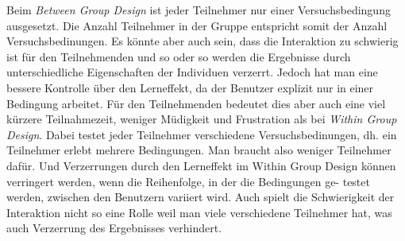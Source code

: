 Beim \textit{Between Group Design} ist jeder 
Teilnehmer nur einer Versuchsbedingung ausgesetzt.
Die Anzahl Teilnehmer in der Gruppe entspricht somit der Anzahl Versuchsbedinungen.
Es könnte aber auch sein, dass die Interaktion zu schwierig ist für den Teilnehmenden und 
so oder so werden die Ergebnisse durch unterschiedliche Eigenschaften der Individuen verzerrt.
Jedoch hat man eine bessere Kontrolle über den Lerneffekt, da der Benutzer explizit nur in einer Bedingung arbeitet. 
Für den Teilnehmenden bedeutet dies aber auch eine viel kürzere Teilnahmezeit, weniger Müdigkeit
und Frustration als bei \textit{Within Group Design}. Dabei testet jeder Teilnehmer verschiedene
Versuchsbedinungen, dh. ein Teilnehmer erlebt mehrere Bedingungen. Man braucht also weniger Teilnehmer 
dafür. Und Verzerrungen durch den Lerneffekt im Within Group Design können
verringert werden, wenn die Reihenfolge, in der die Bedingungen ge-
testet werden, zwischen den Benutzern variiert wird. Auch spielt die Schwierigkeit der 
Interaktion nicht so eine Rolle weil man viele verschiedene Teilnehmer hat, was auch
Verzerrung des Ergebnisses verhindert.


